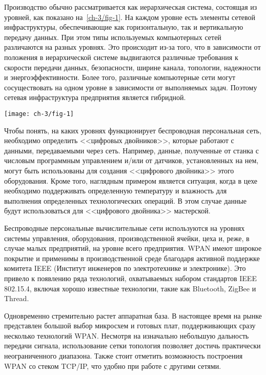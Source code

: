 Производство обычно рассматривается как иерархическая система, состоящая из уровней, как показано на~\cref{ch-3/fig-1}. На каждом уровне есть элементы сетевой инфраструктуры, обеспечивающие как горизонтальную, так и вертикальную передачу данных.
При этом типы используемых компьютерных сетей различаются на разных уровнях. Это происходит из-за того, что в зависимости от положения в иерархической системе выдвигаются различные требования к скорости передачи данных, безопасности, ширине канала, топологии, надежности и энергоэффективности. Более того, различные компьютерные сети могут сосуществовать на одном уровне в зависимости от выполняемых задач. Поэтому сетевая инфраструктура предприятия является гибридной.

\begin{figure*} [tb]
	\centering
	\texttt{[image: ch-3/fig-1]}
	\caption{Уровни производственной системы}
	\label{ch-3/fig-1}
\end{figure*}

Чтобы понять, на каких уровнях функционирует беспроводная персональная сеть, необходимо определить <<цифровых двойников>>, которые работают с данными, передаваемыми через сеть. Например, данные, полученные от станка с числовым программным управлением и/или от датчиков, установленных на нем, могут быть использованы для создания <<цифрового двойника>> этого оборудования. Кроме того, наглядным примером является ситуация, когда в цехе необходимо поддерживать определенную температуру и влажность для выполнения определенных технологических операций. В этом случае данные будут использоваться для <<цифрового двойника>> мастерской.

Беспроводные персональные вычислительные сети используются на уровнях системы управления, оборудования, производственной ячейки, цеха и, реже, в случае малых предприятий, на уровне всего предприятия. WPAN имеют широкое покрытие и применимы в производственной среде благодаря активной поддержке комитета IEEE (Институт инженеров по электротехнике и электронике). Это привело к появлению ряда технологий, охватываемых набором стандартов IEEE 802.15.4, включая хорошо известные технологии, такие как Bluetooth, ZigBee и Thread.

Одновременно стремительно растет аппаратная база. В настоящее время на рынке представлен большой выбор микросхем и готовых плат, поддерживающих сразу несколько технологий WPAN. Несмотря на изначально небольшую дальность передачи сигнала, использование сетки топология позволяет достичь практически неограниченного диапазона. Также стоит отметить возможность построения WPAN со стеком TCP/IP, что удобно при работе с другими сетями.

